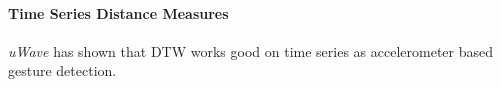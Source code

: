 \paragraph{Time Series Distance Measures} \label{time_series_distance_measures}
\textit{uWave} \cite{liu2009uwave} has shown that DTW works good on time series as accelerometer based gesture
detection.
